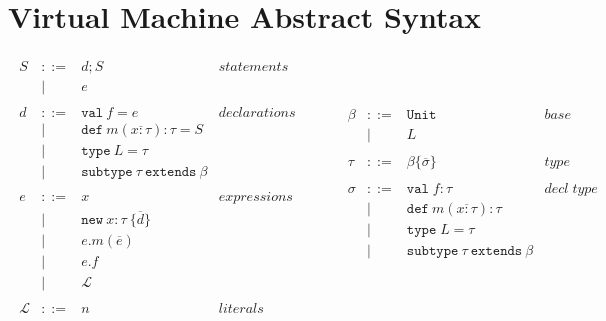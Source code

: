 \documentclass{article}
\newcommand{\keywadj}[1]{\mathtt{#1}}
\newcommand{\keyw}[1]{\keywadj{#1}~}
\begin{document}
\section{Virtual Machine Abstract Syntax}

\[
\begin{array}{lll}
\begin{array}{lllr}
S & ::= & d; S& statements \\
  & |   & e & \\
&&\\
d & ::= & \keyw{val} f = e & declarations \\
  & |   & \keyw{def} m(\overline{x:\tau}) : \tau = S &\\
  & |   & \keyw{type} L = \tau &\\
  & |   & \keyw{subtype} \tau ~\keyw{extends} \beta &\\
&&\\
e & ::= & x & expressions \\
& | & \keywadj{new}~x:\tau~\{\overline{d}\}&\\
& | & e.m(\overline{e}) &\\
& | & e.f &\\
& | & \mathscr{L} &\\
&&\\
\mathscr{L} & ::= & n & literals \\
\end{array}
& ~~~~~~
&
\begin{array}{lllr}
\beta & ::= & \keyw{Unit} & \textit{base type} \\
      & |   & L \\
&&\\
\tau & ::= & \beta \{\overline{\sigma}\} & type \\
&&\\
\sigma & ::= & \texttt{val} \; f:\tau & decl \; type\\
       & |   & \keyw{def} m(\overline{x:\tau}) : \tau &\\
       & |   & \texttt{type} \; L = \tau &\\ %
       & |   & \keyw{subtype} \tau ~\keyw{extends} \beta &\\
&&\\
\end{array}
\end{array}
\]
\end{document}
